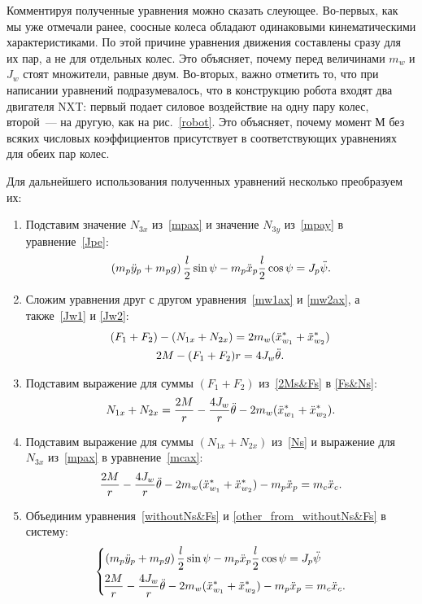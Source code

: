\documentclass[12pt,a4paper,openany]{extarticle}
\begin{document}
Комментируя полученные уравнения можно сказать слеующее.
Во-первых, как мы уже отмечали ранее, соосные колеса обладают одинаковыми кинематическими характеристиками.
По этой причине уравнения движения составлены сразу для их пар, а не для отдельных колес.
Это объясняет, почему перед величинами $m_w$ и $J_w$ стоят множители, равные двум.
Во-вторых, важно отметить то, что при написании уравнений подразумевалось, что в конструкцию робота входят два двигателя NXT: первый подает силовое воздействие на одну пару колес, второй~--- на другую, как на рис.~\ref{robot}.
Это объясняет, почему момент $М$ без всяких числовых коэффициентов присутствует в соответствующих уравнениях для обеих пар колес. 

Для дальнейшего использования полученных уравнений несколько преобразуем их:
\begin{enumerate}
	\item Подставим значение $N_{3x}$ из~\eqref{mpax} и значение $N_{3y}$ из~\eqref{mpay} в уравнение~\eqref{Jpe}:
		\begin{equation}\label{other_from_withoutNs&Fs}
			\left(m_p\ddot{y}_p + m_pg\right)\frac{l}{2}\sin\psi - m_p\ddot{x}_p\frac{l}{2}\cos\psi = J_p\ddot{\psi}\ldotp
		\end{equation}
	\item Сложим уравнения друг с другом уравнения~\eqref{mw1ax} и \eqref{mw2ax}, а также~\eqref{Jw1} и \eqref{Jw2}:
		\begin{gather}
			\!(F_1 + F_2) - (N_{1x} + N_{2x}) = 2m_w(\ddot{x}_{w_1}^* + \ddot{x}_{w_2}^*)\label{Fs&Ns}\\
			\!2M - (F_1 + F_2)r = 4J_w\ddot{\theta}\label{2Ms&Fs}\ldotp
		\end{gather}
	\item Подставим выражение для суммы $(F_1 + F_2)$ из~\eqref{2Ms&Fs} в \eqref{Fs&Ns}:
		\begin{equation}
			N_{1x} + N_{2x} = \frac{2M}{r} - \frac{4J_w}{r}\ddot{\theta} - 2m_w(\ddot{x}_{w_1}^* + \ddot{x}_{w_2}^*)\ldotp\label{Ns}
		\end{equation}
	\item Подставим выражение для суммы $(N_{1x} + N_{2x})$ из~\eqref{Ns} и выражение для $N_{3x}$ из~\eqref{mpax} в уравнение~\eqref{mcax}:
		\begin{equation}\label{withoutNs&Fs}
			\frac{2M}{r} - \frac{4J_w}{r}\ddot{\theta} - 2m_w(\ddot{x}_{w_1}^* + \ddot{x}_{w_2}^*) - m_p\ddot{x}_p = m_c\ddot{x}_c\ldotp	
		\end{equation}
	\item Объединим уравнения~\eqref{withoutNs&Fs} и \eqref{other_from_withoutNs&Fs} в систему:
		\begin{equation}\label{XWs&XCs}
			\left\{
				\begin{aligned}
					\!&\left(m_p\ddot{y}_p + m_pg\right)\frac{l}{2}\sin\psi - m_p\ddot{x}_p\frac{l}{2}\cos\psi = J_p\ddot{\psi}\\
					\!&\frac{2M}{r} - \frac{4J_w}{r}\ddot{\theta} - 2m_w(\ddot{x}_{w_1}^* + \ddot{x}_{w_2}^*) - m_p\ddot{x}_p =
					 m_c\ddot{x}_c\ldotp
				\end{aligned}
			\right.
		\end{equation}
\end{enumerate}
\end{document}
